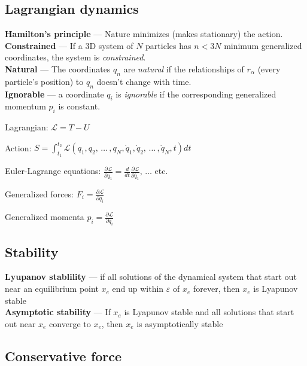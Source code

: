\documentclass[letterpaper,landscape,10pt]{article}
\newenvironment{mydescription}
{\begin{description}
	\setlength{\itemsep}{0pt}
	\setlength{\parskip}{0pt}
	\setlength{\parsep}{-1pt}}
{\end{description}}
\begin{document}
{\begin{multicols}{4}
	\subsection*{Lagrangian dynamics}
			  \textbf{Hamilton's principle} --- Nature minimizes (makes
			  stationary) the action. \\
			  \textbf{Constrained} --- If a 3D system of $N$ particles has $n <
			  3N$ minimum generalized coordinates, the system is
			  \emph{constrained}. \\
			  \textbf{Natural} --- The coordinates $q_n$ are \emph{natural} if
			  the relationships of $r_\alpha$ (every particle's position) to
			  $q_n$ doesn't change with time.\\
			  \textbf{Ignorable} --- a coordinate $q_i$ is \emph{ignorable} if
			  the corresponding generalized momentum $p_i$ is constant.\\
		\begin{mydescription}
			\item[Lagrangian:]
			  $\mathscr{L}=T-U$
			\item[Action:]
			  $S = \int_{t_1}^{t_2}\mathscr{L}(q_1,q_2,\,\dots\, ,q_N,\dot{q}_1,\dot{q}_2,\,\dots \,,\dot{q}_N,t)dt$
			\item[Euler-Lagrange equations:]$\frac{\partial \mathscr{L}}{\partial q_1}=\frac{d}{dt}\frac{\partial \mathscr{L}}{\partial \dot{q_1}},\,\dots$ etc.
			\item[Generalized forces:]$F_i=\frac{\partial \mathscr{L}}{\partial
			  q_i}$
			\item[Generalized momenta]$p_i = \frac{\partial \mathscr{L}}{\partial \dot{q_i}}$
		\end{mydescription}

	\subsection*{Stability}
			  \textbf{Lyupanov stablility} --- if all solutions of the
			  dynamical system that start out near an equilibrium point $x_e$
			  end up within $\varepsilon$ of $x_e$ forever, then $x_e$ is
			  Lyapunov stable \\
			  \textbf{Asymptotic stability} --- If $x_e$ is Lyapunov stable and
			  all solutions that start out near $x_e$ converge to $x_e$, then
			  $x_e$ is asymptotically stable

	\subsection*{Conservative force}

\end{multicols}}
\end{document}
